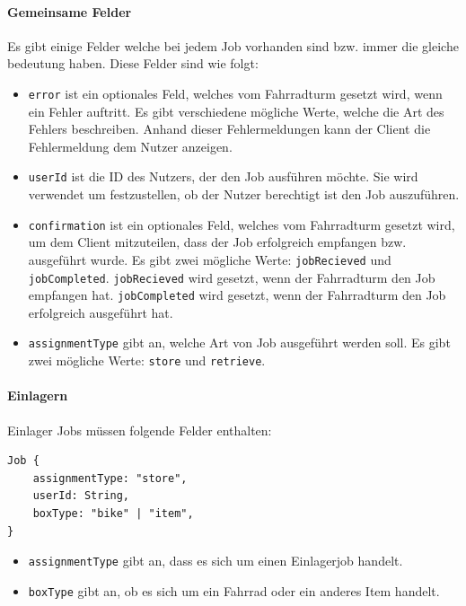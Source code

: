 \paragraph{Gemeinsame Felder}

Es gibt einige Felder welche bei jedem Job vorhanden sind bzw. immer die gleiche bedeutung haben. Diese Felder sind wie folgt:

\begin{itemize}
  \item \texttt{error} ist ein optionales Feld, welches vom Fahrradturm gesetzt wird, wenn ein Fehler auftritt. Es gibt verschiedene mögliche Werte, welche die Art des Fehlers beschreiben. Anhand dieser Fehlermeldungen kann der Client die Fehlermeldung dem Nutzer anzeigen.
  \item \texttt{userId} ist die ID des Nutzers, der den Job ausführen möchte. Sie wird verwendet um festzustellen, ob der Nutzer berechtigt ist den Job auszuführen.
  \item \texttt{confirmation} ist ein optionales Feld, welches vom Fahrradturm gesetzt wird, um dem Client mitzuteilen, dass der Job erfolgreich empfangen bzw. ausgeführt wurde. Es gibt zwei mögliche Werte: \texttt{jobRecieved} und \texttt{jobCompleted}. \texttt{jobRecieved} wird gesetzt, wenn der Fahrradturm den Job empfangen hat. \texttt{jobCompleted} wird gesetzt, wenn der Fahrradturm den Job erfolgreich ausgeführt hat.
  \item \texttt{assignmentType} gibt an, welche Art von Job ausgeführt werden soll. Es gibt zwei mögliche Werte: \texttt{store} und \texttt{retrieve}.
\end{itemize}


\paragraph{Einlagern}

Einlager Jobs müssen folgende Felder enthalten:

\begin{verbatim}
Job {
    assignmentType: "store",
    userId: String,
    boxType: "bike" | "item",
}
\end{verbatim}

\begin{itemize}
  \item \texttt{assignmentType} gibt an, dass es sich um einen Einlagerjob handelt.
  \item \texttt{boxType} gibt an, ob es sich um ein Fahrrad oder ein anderes Item handelt.
\end{itemize}

